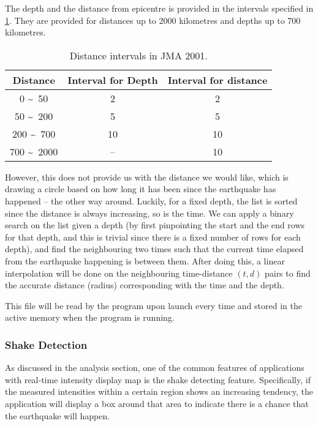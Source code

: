 The depth and the distance from epicentre is provided in the intervals specified in \ref{tab:dist-jma-2001}. They are provided for distances up to 2000 kilometres and depths up to 700 kilometres.

\begin{table}[!ht]
    \centering

    \begin{tabular}{|c|c|c|}
        \hline
        Distance                  & Interval for Depth & Interval for distance \\
        \hline
        0 \textasciitilde\ 50     & 2                  & 2                     \\
        50 \textasciitilde\ 200   & 5                  & 5                     \\
        200 \textasciitilde\ 700  & 10                 & 10                    \\
        700 \textasciitilde\ 2000 & --                 & 10                    \\
        \hline
    \end{tabular}
    \caption{Distance intervals in JMA 2001.}
    \label{tab:dist-jma-2001}
\end{table}

However, this does not provide us with the distance we would like, which is drawing a circle based on how long it has been since the earthquake has happened -- the other way around. Luckily, for a fixed depth, the list is sorted since the distance is always increasing, so is the time. We can apply a binary search on the list given a depth (by first pinpointing the start and the end rows for that depth, and this is trivial since there is a fixed number of rows for each depth), and find the neighbouring two times such that the current time elapsed from the earthquake happening is between them. After doing this, a linear interpolation will be done on the neighbouring time-distance \((t, d)\) pairs to find the accurate distance (radius) corresponding with the time and the depth.

This file will be read by the program upon launch every time and stored in the active memory when the program is running.

\subsubsection{Shake Detection}

As discussed in the analysis section, one of the common features of applications with real-time intensity display map is the shake detecting feature. Specifically, if the measured intensities within a certain region shows an increasing tendency, the application will display a box around that area to indicate there is a chance that the earthquake will happen.

